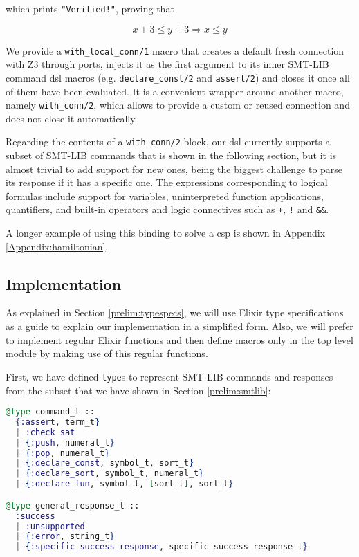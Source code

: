 which prints \verb|"Verified!"|, proving that 

$$x + 3\leq y + 3 \Rightarrow x \leq y$$

We provide a \verb|with_local_conn/1| macro that creates a default fresh
connection with Z3 through ports, injects it as the first argument to its inner
SMT-LIB command \gls{dsl} macros (e.g. \verb|declare_const/2| and
\verb|assert/2|) and closes it once all of them have been evaluated. It is a
convenient wrapper around another macro, namely \verb|with_conn/2|, which allows
to provide a custom or reused connection and does not close it automatically.

Regarding the contents of a \verb|with_conn/2| block, our \gls{dsl} currently
supports a subset of SMT-LIB commands that is shown in the following section,
but it is almost trivial to add support for new ones, being the biggest
challenge to parse its response if it has a specific one.  The expressions
corresponding to logical formulas include support for variables, uninterpreted
function applications, quantifiers, and built-in operators and logic connectives
such as \verb|+|, \verb|!| and \verb|&&|.

A longer example of using this binding to solve a \gls{csp} is shown in Appendix
\ref{Appendix:hamiltonian}.

\subsection{Implementation}

As explained in Section \ref{prelim:typespecs}, we will use Elixir type
specifications as a guide to explain our implementation in a simplified form.
Also, we will prefer to implement regular Elixir functions and then define 
macros only in the top level module by making use of this regular functions.

First, we have defined \verb|type|s to represent SMT-LIB commands and responses
from the subset that we have shown in Section \ref{prelim:smtlib}:

\begin{lstlisting}[language=elixir,numbers=none,frame=none]
@type command_t ::
  {:assert, term_t}
  | :check_sat
  | {:push, numeral_t}
  | {:pop, numeral_t}
  | {:declare_const, symbol_t, sort_t}
  | {:declare_sort, symbol_t, numeral_t}
  | {:declare_fun, symbol_t, [sort_t], sort_t}

@type general_response_t ::
  :success
  | :unsupported
  | {:error, string_t}
  | {:specific_success_response, specific_success_response_t}
\end{lstlisting}

